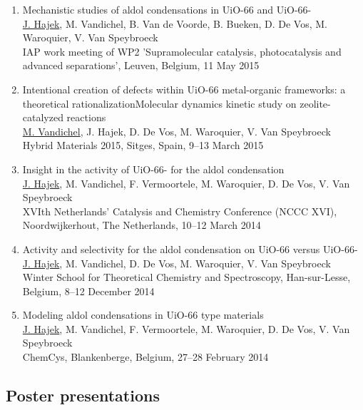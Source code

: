 \begin{enumerate}
\item
Mechanistic studies of aldol condensations in UiO-66 and UiO-66-\\
\underline{J. Hajek}, M. Vandichel, B. Van de Voorde, B. Bueken, D. De Vos, M.
Waroquier, V. Van Speybroeck\\
IAP work meeting of WP2 'Supramolecular catalysis, photocatalysis and advanced
separations', Leuven, Belgium, 11 May 2015

\item
Intentional creation of defects within UiO-66 metal-organic frameworks: a
theoretical rationalizationMolecular dynamics kinetic study on zeolite-catalyzed reactions\\
\underline{M. Vandichel}, J. Hajek, D. De Vos, M. Waroquier, V. Van Speybroeck\\
Hybrid Materials 2015, Sitges, Spain, 9--13 March 2015

\item
Insight in the activity of UiO-66- for the aldol condensation\\
\underline{J. Hajek}, M. Vandichel, F. Vermoortele, M. Waroquier, D. De Vos, V.
Van Speybroeck\\
XVIth Netherlands' Catalysis and Chemistry Conference (NCCC XVI),
Noordwijkerhout, The Netherlands, 10--12 March 2014

\item
Activity and selectivity for the aldol condensation on UiO-66 versus
UiO-66-\\
\underline{J. Hajek}, M. Vandichel, D. De Vos, M. Waroquier, V. Van Speybroeck\\
Winter School for Theoretical Chemistry and Spectroscopy, Han-sur-Lesse,
Belgium, 8--12 December 2014

\item
Modeling aldol condensations in UiO-66 type materials\\
\underline{J. Hajek}, M. Vandichel, F. Vermoortele, M. Waroquier, D. De Vos, V. Van Speybroeck\\
ChemCys, Blankenberge, Belgium, 27--28 February 2014


\end{enumerate}


\subsection*{Poster presentations}

